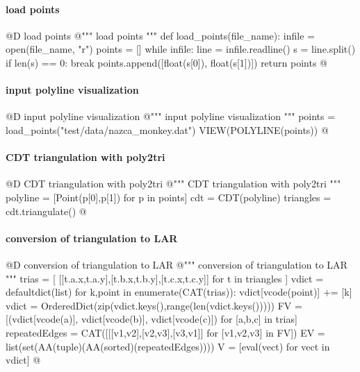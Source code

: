 \documentclass[11pt,oneside]{article}    %
\begin{document}
\paragraph{load points}
@D load points
@{""" load points """
def load_points(file_name):
    infile = open(file_name, "r")
    points = []
    while infile:
        line = infile.readline()
        s = line.split()
        if len(s) == 0:
            break
        points.append([float(s[0]), float(s[1])])
    return points
@}


\paragraph{input polyline visualization}
@D input polyline visualization
@{""" input polyline visualization """
points = load_points("test/data/nazca_monkey.dat")
VIEW(POLYLINE(points))
@}

\paragraph{CDT triangulation with poly2tri}
@D CDT triangulation with poly2tri
@{""" CDT triangulation with poly2tri """
polyline = [Point(p[0],p[1]) for p in points]  
cdt = CDT(polyline)
triangles = cdt.triangulate()
@}
  
\paragraph{conversion of triangulation to LAR}
@D conversion of triangulation to LAR
@{""" conversion of triangulation to LAR """
trias = [ [[t.a.x,t.a.y],[t.b.x,t.b.y],[t.c.x,t.c.y]] for t in triangles ]
vdict = defaultdict(list)
for k,point in enumerate(CAT(trias)): 
    vdict[vcode(point)] += [k]
vdict = OrderedDict(zip(vdict.keys(),range(len(vdict.keys()))))
FV = [(vdict[vcode(a)], vdict[vcode(b)], vdict[vcode(c)]) for [a,b,c] in trias] 
repeatedEdges = CAT([[[v1,v2],[v2,v3],[v3,v1]] for [v1,v2,v3] in FV])
EV = list(set(AA(tuple)(AA(sorted)(repeatedEdges))))
V = [eval(vect) for vect in vdict]
@}
\end{document}
